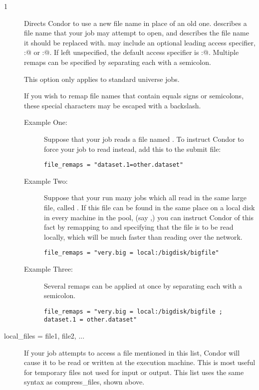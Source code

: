 \begin{ManPage}{\label{man-condor-submit}}{1}
\begin{description}
Directs Condor to use a new file name in place of an old one.  
describes a file name that your job may attempt to open, and 
describes the file name it should be replaced with.
 may include an optional leading
access specifier, \verb@local:@ or \verb@remote:@.  If left unspecified,
the default access specifier is \verb@remote:@.  Multiple remaps can be
specified by separating each with a semicolon.

This option only applies to standard universe jobs.

If you wish to remap file names that contain equals signs or semicolons,
these special characters may be escaped with a backslash.

\begin{description}
\item[Example One:]
Suppose that your job reads a file named .
To instruct Condor
to force your job to read  instead,
add this to the submit file:
\begin{verbatim}
file_remaps = "dataset.1=other.dataset"
\end{verbatim}
\item[Example Two:]
Suppose that your run many jobs which all read in the same large file,
called .
If this file can be found in the same place on
a local disk in every machine in the pool,
(say ,) you can
instruct Condor of this fact by remapping  to
 and specifying that the file is to be read locally,
which will be much faster than reading over the network.
\begin{verbatim}
file_remaps = "very.big = local:/bigdisk/bigfile"
\end{verbatim}
\item[Example Three:]
Several remaps can be applied at once by separating each with a semicolon.
\footnotesize
\begin{verbatim}
file_remaps = "very.big = local:/bigdisk/bigfile ; dataset.1 = other.dataset"
\end{verbatim}
\normalsize
\end{description}



\item[local\_files = file1, file2, ...]

If your job attempts to access a file mentioned in this list,
Condor will cause it to be read or written at the execution machine.
This is most useful for temporary files not used for input or output.
This list uses the same syntax as compress\_files, shown above.


\end{description}
\end{ManPage}
